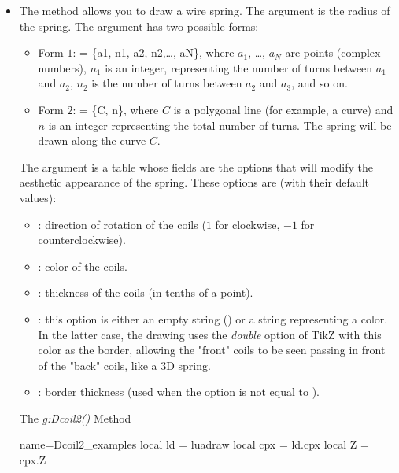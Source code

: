 \begin{itemize}
    \item The method  allows you to draw a wire spring. The argument  is the radius of the spring. The argument  has two possible forms:
    \begin{itemize}
        \item Form $1$:  = \{a1, ​​n1, a2, n2,\ldots, aN\}, where $a_1$, \ldots, $a_N$ are points (complex numbers), $n_1$ is an integer, representing the number of turns between $a_1$ and $a_2$, $n_2$ is the number of turns between $a_2$ and $a_3$, and so on.

        \item Form $2$:  = \{C, n\}, where $C$ is a polygonal line (for example, a curve) and $n$ is an integer representing the total number of turns. The spring will be drawn along the curve $C$.
    \end{itemize}
    The argument  is a table whose fields are the options that will modify the aesthetic appearance of the spring. These options are (with their default values):
    \begin{itemize}
        \item {}: direction of rotation of the coils ($1$ for clockwise, $-1$ for counterclockwise).

        \item {}: color of the coils.

        \item {}: thickness of the coils (in tenths of a point).

        \item {}: this option is either an empty string () or a string representing a color. In the latter case, the drawing uses the \emph{double} option of TikZ with this color as the border, allowing the "front" coils to be seen passing in front of the "back" coils, like a 3D spring. 

        \item {}: border thickness (used when the  option is not equal to \nil).
        \end{itemize}

\begin{demo}{The \emph{g:Dcoil2()} Method}
\begin{luadraw}{name=Dcoil2_examples}
local ld = luadraw
local cpx = ld.cpx
local Z = cpx.Z


\end{luadraw}
\end{demo}
\end{itemize}

